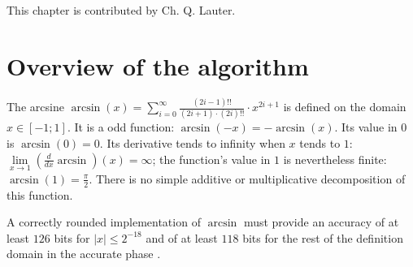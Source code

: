 This chapter is contributed by Ch. Q. Lauter.


\section{Overview of the algorithm\label{sec:asin-overview}}
The arcsine $\arcsin\left( x \right) = \sum\limits_{i=0}^{\infty}
\frac{\left( 2i - 1 \right)!!}{\left(2i+1\right) \cdot \left( 2i
\right)!!} \cdot x^{2i+1}$ is defined on the domain $x \in \left[ -1;
1 \right]$. It is a odd function: $\arcsin\left(-x\right) =
-\arcsin\left( x \right)$. Its value in $0$ is $\arcsin\left( 0
\right) = 0$. Its derivative tends to infinity when $x$ tends to $1$:
$\lim\limits_{x \rightarrow 1} \left( \frac{d}{dx} \arcsin
\right)\left(x\right) = \infty$; the function's value in $1$ is
nevertheless finite: $\arcsin\left( 1 \right) = \frac{\pi}{2}$.  There
is no simple additive or multiplicative decomposition of this
function.

A correctly rounded implementation of $\arcsin$ must provide an
accuracy of at least $126$ bits for $\left \vert x \right \vert \leq
2^{-18}$ and of at least $118$ bits for the rest of the definition
domain in the accurate phase \cite{DinDefLau2004LIP}.

